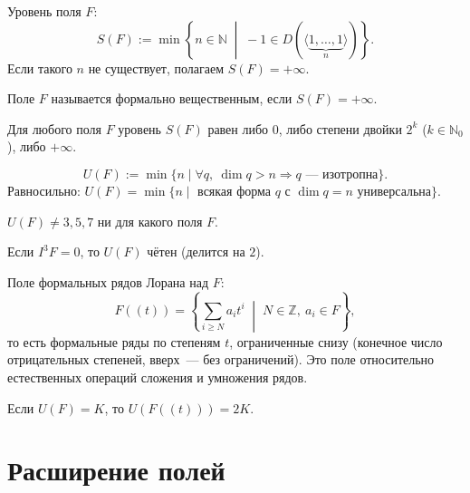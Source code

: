 \documentclass[12pt]{article}
\begin{document}
	\begin{definition}
		Уровень поля $F$:
		\[
		S(F) := \min \left\{ n \in \mathbb{N} \; \middle| \; -1 \in D \left( \langle \underbrace{1, \dots, 1}_{n} \rangle \right) \right\}.
		\]
		Если такого $n$ не существует, полагаем $S(F) = +\infty$.
	\end{definition}
	
	\begin{definition}
		Поле $F$ называется формально вещественным, если $S(F) = +\infty$.
	\end{definition}
	
	\begin{theorem}[Пфистер]
		Для любого поля $F$ уровень $S(F)$ равен либо $0$, либо степени двойки $2^k$ ($k \in \mathbb{N}_0$), либо $+\infty$.
	\end{theorem}
	
	\begin{definition}[$u$-инвариант]
		\[
		U(F) := \min \{ n \mid \forall q, \ \dim q > n \Rightarrow q \text{~--- изотропна} \}.
		\]
		Равносильно: $U(F) = \min \{ n \mid$ всякая форма $q$ с $\dim q = n$ универсальна$ \}$.
	\end{definition}
	
	\begin{theorem}
		$U(F) \neq 3, 5, 7$ ни для какого поля $F$.
	\end{theorem}
	
	\begin{theorem}
		Если $I^3 F = 0$, то $U(F)$ чётен (делится на $2$).
	\end{theorem}
	
	\begin{example}
		Поле формальных рядов Лорана над $F$:
		\[
		F((t)) = \left\{ \sum_{i \geqslant N} a_i t^i \; \middle| \; N \in \mathbb{Z}, \ a_i \in F \right\},
		\]
		то есть формальные ряды по степеням $t$, ограниченные снизу (конечное число отрицательных степеней, вверх~--- без ограничений). Это поле относительно естественных операций сложения и умножения рядов.
	\end{example}
	
	\begin{lemma}
		Если $U(F) = K$, то $U(F((t))) = 2K$.
	\end{lemma}
	
	\section{Расширение полей}
	
\end{document}
